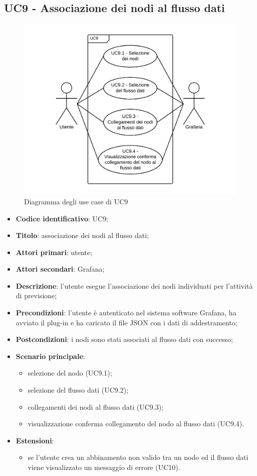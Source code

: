 \subsection{UC9 - Associazione dei nodi al flusso dati}
\begin{figure}[H]
\includegraphics{img/UC9_-_Associazione_dei_nodi_al_flusso_dati.png}
\caption{Diagramma degli use case di UC9}
\end{figure}
\begin{itemize}
	\item \textbf{Codice identificativo}: UC9;
	\item \textbf{Titolo}: associazione dei nodi al flusso dati;
	\item \textbf{Attori primari}: utente;
	\item \textbf{Attori secondari}: Grafana\glo;
	\item \textbf{Descrizione}: l'utente esegue l'associazione dei nodi individuati per l'attività di previsione;
	\item \textbf{Precondizioni}: l'utente è autenticato nel sistema software Grafana\glosp, ha avviato il plug-in e ha caricato il file JSON con i dati di addestramento;
	\item \textbf{Postcondizioni}: i nodi sono stati associati al flusso dati con successo;
	\item \textbf{Scenario principale}: 
		\begin{itemize}
			\item selezione del nodo (UC9.1);
			\item selezione del flusso dati (UC9.2);
			\item collegamenti dei nodi al flusso dati (UC9.3);
			\item visualizzazione conferma collegamento del nodo al flusso dati (UC9.4).
		\end{itemize}
	\item \textbf{Estensioni}:
		\begin{itemize}
			\item se l'utente crea un abbinamento non valido tra un nodo ed il flusso dati viene visualizzato un messaggio di errore (UC10).
		\end{itemize}
\end{itemize}

